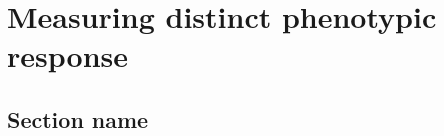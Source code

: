 \documentclass[a4paper,11pt,twoside,openright]{scrbook}
\begin{document}
\chapter{Measuring distinct phenotypic response} \label{chapter:tccs}

\section{Section name}

\end{document}

